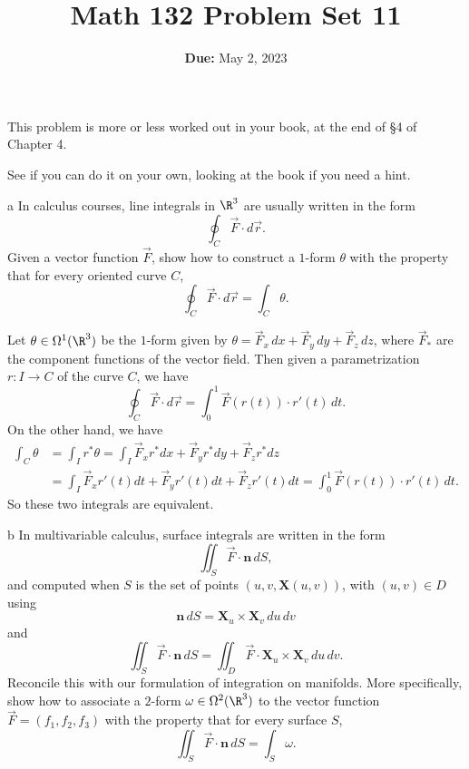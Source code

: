 \documentclass[11pt,letterpaper]{article}
\title{\textbf{Math 132 Problem Set 11}}
\date{\textbf{Due: } May 2, 2023}
\begin{document}
\maketitle

\begin{cproblem}{1}
    This problem is more or less worked out in your book, at the end of \S4 of Chapter 4.
\end{cproblem}

\begin{solution}
    See if you can do it on your own, looking at the book if you need a hint.
    \begin{partproblem}{a}
        In calculus courses, line integrals in $\R^3$ are usually written in the form
        \[
            \oint_C \vec{F}\cdot d\vec{r}
        .\] 
        Given a vector function $\vec{F}$, show how to construct a $1$-form $\theta$ with the property that for every oriented curve $C$,
        \[
            \oint_C \vec{F}\cdot d\vec{r} = \int_C \theta
        .\] 
    \end{partproblem}

    \quad Let $\theta\in \Omega^1(\R^3)$ be the $1$-form given by $\theta = \vec{F}_x\, dx + \vec{F}_y\, dy + \vec{F}_z\, dz$, where $\vec{F}_*$ are the component functions of the vector field. Then given a parametrization $r : I \to C$ of the curve $C$, we have
    \[
        \oint_C \vec{F}\cdot d\vec{r} = \int_0^1 \vec{F}(r(t))\cdot r'(t)\,dt
    .\] 
    On the other hand, we have
    \[
        \begin{aligned}
            \int_C \theta &= \int_I r^* \theta = \int_I \vec{F}_x r^* dx + \vec{F}_y r^* dy+\vec{F}_z r^* dz \\&= \int_I \vec{F}_x r'(t)dt + \vec{F}_y r'(t)dt +\vec{F}_z r'(t)dt=\int_0^1 \vec{F}(r(t))\cdot r'(t)\,dt. 
        \end{aligned}   
    \]
    So these two integrals are equivalent.  

    \begin{partproblem}{b}
        In multivariable calculus, surface integrals are written in the form
        \[
            \iint_S \vec{F}\cdot \mathbf{n}\,dS,
        \]
        and computed when $S$ is the set of points $(u,v,\mathbf{X}(u,v))$, with $(u,v)\in D$ using
        \[
            \mathbf{n}\,dS = \mathbf{X}_u\times \mathbf{X}_v\,du\,dv
        \]
        and
        \[
            \iint_S \vec{F}\cdot \mathbf{n}\,dS = \iint_D \vec{F}\cdot \mathbf{X}_u\times\mathbf{X}_v\,du\,dv
        .\]
        Reconcile this with our formulation of integration on manifolds. More specifically, show how to associate a $2$-form $\omega\in \Omega^2(\R^3)$ to the vector function $\vec{F} = (f_1, f_2, f_3)$ with the property that for every surface $S$,
        \[
            \iint_S \vec{F}\cdot \mathbf{n}\,dS = \int_S \omega
        .\]
    \end{partproblem}


\end{solution}
\end{document}
